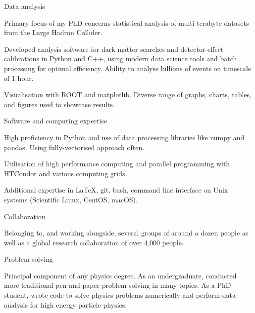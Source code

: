 
\newcommand{\vpaddingskills}{\vspace{1mm}}

\begin{cventries}

    \cventry
    {} %
    {Data analysis} %
    {} %
    {} %
    {
      \begin{cvitems}
        \item {Primary focus of my PhD concerns statistical analysis of multi-terabyte datasets from the Large Hadron Collider.}
        \item {Developed analysis software for dark matter searches and detector-effect calibrations in Python and C++, using modern data science tools and batch processing for optimal efficiency. Ability to analyse billions of events on timescale of 1 hour.}
        \item{Visualisation with ROOT and matplotlib. Diverse range of graphs, charts, tables, and figures used to showcase results.}
        \vpaddingskills
        \end{cvitems}
    }

    \cventry
    {} %
    {Software and computing expertise} %
    {} %
    {} %
    {
      \begin{cvitems}
        \item {High proficiency in Python and use of data processing libraries like numpy and pandas. Using fully-vectorised approach often.}
        \item {Utilisation of high performance computing and parallel programming with HTCondor and various computing grids.}
        \item{Additional expertise in LaTeX, git, bash, command line interface on Unix systems (Scientific Linux, CentOS, macOS).}
        \vpaddingskills
        \end{cvitems}
    }

    \cventry
    {}
    {Collaboration}
    {}
    {}
    {
      \begin{cvitems}
        \item {Belonging to, and working alongside, several groups of around a dozen people as well as a global research collaboration of over 4,000 people.}
        \vpaddingskills
        \end{cvitems}
    }

    \cventry
    {}
    {Problem solving}
    {}
    {}
    {
      \begin{cvitems}
        \item {Principal component of any physics degree. As an undergraduate, conducted more traditional pen-and-paper problem solving in many topics. As a PhD student, wrote code to solve physics problems numerically and perform data analysis for high energy particle physics.}
        \vpaddingskills
        \end{cvitems}
    }


\end{cventries}
